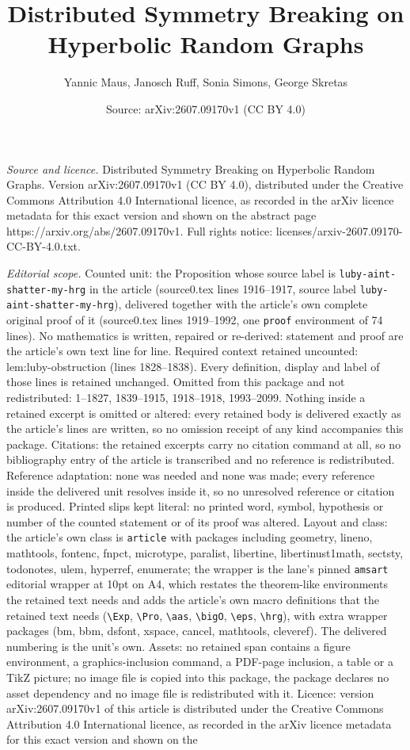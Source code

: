 \documentclass[10pt,a4paper]{amsart}
\title[Distributed Symmetry Breaking on Hyperbolic Random Graphs]{Distributed Symmetry Breaking on Hyperbolic Random Graphs}
\author{Yannic Maus, Janosch Ruff, Sonia Simons, George Skretas}
\date{Source: arXiv:2607.09170v1 (CC BY 4.0)}
\begin{document}
\maketitle

\noindent\emph{Source and licence.} Distributed Symmetry Breaking on Hyperbolic Random Graphs. Version arXiv:2607.09170v1 (CC BY 4.0), distributed under the Creative Commons Attribution 4.0 International licence, as recorded in the arXiv licence metadata for this exact version and shown on the abstract page https://arxiv.org/abs/2607.09170v1. Full rights notice: licenses/arxiv-2607.09170-CC-BY-4.0.txt.\par\smallskip

\noindent\textit{Editorial scope.} Counted unit: the Proposition whose source label is \texttt{luby-aint-shatter-my-hrg} in the article (source0.tex lines 1916--1917, source label \texttt{luby-aint-shatter-my-hrg}), delivered together with the article's own complete original proof of it (source0.tex lines 1919--1992, one \texttt{proof} environment of 74 lines). No mathematics is written, repaired or re-derived: statement and proof are the article's own text line for line. Required context retained uncounted: lem:luby-obstruction (lines 1828--1838). Every definition, display and label of those lines is retained unchanged. Omitted from this package and not redistributed: 1--1827, 1839--1915, 1918--1918, 1993--2099. Nothing inside a retained excerpt is omitted or altered: every retained body is delivered exactly as the article's lines are written, so no omission receipt of any kind accompanies this package. Citations: the retained excerpts carry no citation command at all, so no bibliography entry of the article is transcribed and no reference is redistributed. Reference adaptation: none was needed and none was made; every reference inside the delivered unit resolves inside it, so no unresolved reference or citation is produced. Printed slips kept literal: no printed word, symbol, hypothesis or number of the counted statement or of its proof was altered. Layout and class: the article's own class is \texttt{article} with packages including geometry, lineno, mathtools, fontenc, fnpct, microtype, paralist, libertine, libertinust1math, sectsty, todonotes, ulem, hyperref, enumerate; the wrapper is the lane's pinned \texttt{amsart} editorial wrapper at 10pt on A4, which restates the theorem-like environments the retained text needs and adds the article's own macro definitions that the retained text needs (\texttt{\textbackslash Exp}, \texttt{\textbackslash Pro}, \texttt{\textbackslash aas}, \texttt{\textbackslash bigO}, \texttt{\textbackslash eps}, \texttt{\textbackslash hrg}), with extra wrapper packages (bm, bbm, dsfont, xspace, cancel, mathtools, cleveref). The delivered numbering is the unit's own. Assets: no retained span contains a figure environment, a graphics-inclusion command, a PDF-page inclusion, a table or a TikZ picture; no image file is copied into this package, the package declares no asset dependency and no image file is redistributed with it. Licence: version arXiv:2607.09170v1 of this article is distributed under the Creative Commons Attribution 4.0 International licence, as recorded in the arXiv licence metadata for this exact version and shown on the 
\end{document}
